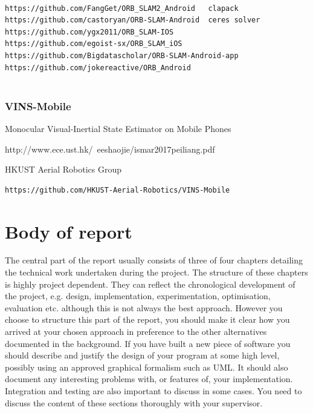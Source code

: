 \documentclass[12pt,twoside]{article}
\begin{document}
\begin{verbatim}

https://github.com/FangGet/ORB_SLAM2_Android   clapack
https://github.com/castoryan/ORB-SLAM-Android  ceres solver 
https://github.com/ygx2011/ORB_SLAM-IOS
https://github.com/egoist-sx/ORB_SLAM_iOS
https://github.com/Bigdatascholar/ORB-SLAM-Android-app
https://github.com/jokereactive/ORB_Android


\end{verbatim}



\subsubsection{VINS-Mobile}
Monocular Visual-Inertial State Estimator on Mobile Phones

http://www.ece.ust.hk/~eeshaojie/ismar2017peiliang.pdf

 HKUST Aerial Robotics Group

\begin{verbatim}
https://github.com/HKUST-Aerial-Robotics/VINS-Mobile
\end{verbatim}

\citep{yang2017monocular}


\newpage


\section{Body of report}
The central part of the report usually consists of three of four chapters detailing the technical work undertaken during the project. The structure of these chapters is highly project dependent. They can reflect the chronological development of the project, e.g. design, implementation, experimentation, optimisation, evaluation etc. although this is not always the best approach. However you choose to structure this part of the report, you should make it clear how you arrived at your chosen approach in preference to the other alternatives documented in the background. If you have built a new piece of software you should describe and justify the design of your program at some high level, possibly using an approved graphical formalism such as UML. It should also document any interesting problems with, or features of, your implementation. Integration and testing are also important to discuss in some cases. You need to discuss the content of these sections thoroughly with your supervisor.\\
\end{document}
